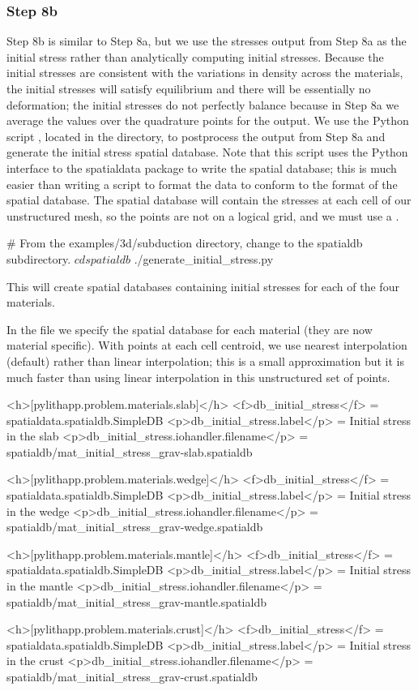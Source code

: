 \subsubsection{Step 8b}

Step 8b is similar to Step 8a, but we use the stresses output from
Step 8a as the initial stress rather than analytically computing
initial stresses. Because the initial stresses are consistent with the
variations in density across the materials, the initial stresses will
satisfy equilibrium and there will be essentially no deformation; the
initial stresses do not perfectly balance because in Step 8a we
average the values over the quadrature points for the output. We use
the Python script , located in
the  directory, to postprocess the output from
Step 8a and generate the initial stress spatial database. Note that
this script uses the Python interface to the spatialdata package to
write the spatial database; this is much easier than writing a script
to format the data to conform to the format of the spatial
database. The spatial database will contain the stresses at each cell
of our unstructured mesh, so the points are not on a logical grid, and
we must use a .
\begin{shell}
# From the examples/3d/subduction directory, change to the spatialdb subdirectory.
$ cd spatialdb
$ ./generate_initial_stress.py
\end{shell}
This will create spatial databases containing initial stresses for
each of the four materials.

In the  file we specify the 
spatial database for each material (they are now material
specific). With points at each cell centroid, we use nearest
interpolation (default) rather than linear interpolation; this is a
small approximation but it is much faster than using linear
interpolation in this unstructured set of points.
\begin{cfg}
<h>[pylithapp.problem.materials.slab]</h>
<f>db_initial_stress</f> = spatialdata.spatialdb.SimpleDB
<p>db_initial_stress.label</p> = Initial stress in the slab
<p>db_initial_stress.iohandler.filename</p> = spatialdb/mat_initial_stress_grav-slab.spatialdb

<h>[pylithapp.problem.materials.wedge]</h>
<f>db_initial_stress</f> = spatialdata.spatialdb.SimpleDB
<p>db_initial_stress.label</p> = Initial stress in the wedge
<p>db_initial_stress.iohandler.filename</p> = spatialdb/mat_initial_stress_grav-wedge.spatialdb

<h>[pylithapp.problem.materials.mantle]</h>
<f>db_initial_stress</f> = spatialdata.spatialdb.SimpleDB
<p>db_initial_stress.label</p> = Initial stress in the mantle
<p>db_initial_stress.iohandler.filename</p> = spatialdb/mat_initial_stress_grav-mantle.spatialdb

<h>[pylithapp.problem.materials.crust]</h>
<f>db_initial_stress</f> = spatialdata.spatialdb.SimpleDB
<p>db_initial_stress.label</p> = Initial stress in the crust
<p>db_initial_stress.iohandler.filename</p> =
spatialdb/mat_initial_stress_grav-crust.spatialdb
\end{cfg}

